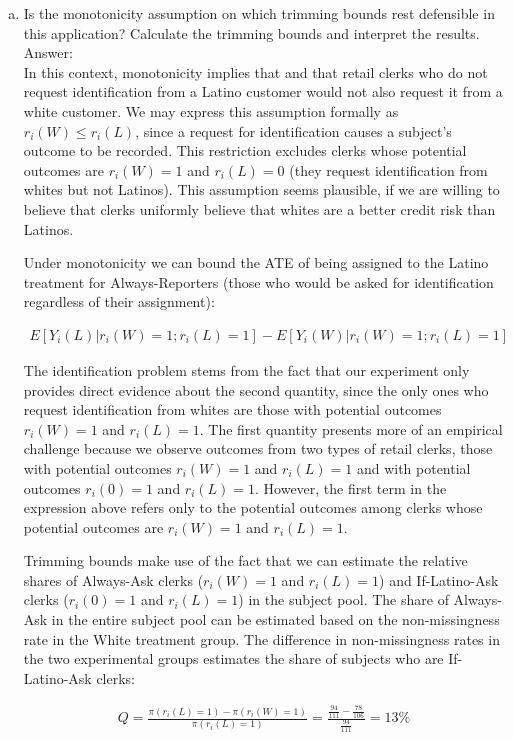 \documentclass[11pt,notitlepage]{article}\usepackage[]{graphicx}\usepackage[]{color}
\begin{document}
\begin{enumerate}[a)]
\item Is the monotonicity assumption on which trimming bounds rest defensible in this application? Calculate the trimming bounds and interpret the results. \\
Answer:\\
In this context, monotonicity implies that and that retail clerks who do not request identification from a Latino customer would not also request it from a white customer. We may express this assumption formally as $r_i(W)\leq r_i(L)$, since a request for identification causes a subject's outcome to be recorded. This restriction excludes clerks whose potential outcomes are $r_i(W)=1$ and $r_i(L)=0$ (they request identification from whites but not Latinos). This assumption seems plausible, if we are willing to believe that clerks uniformly believe that whites are a better credit risk than Latinos.

Under monotonicity we can bound the ATE of being assigned to the Latino treatment for Always-Reporters (those who would be asked for identification regardless of their assignment):

\begin{align*}
E[Y_i(L)|r_i(W)=1; r_i(L)=1]-E[Y_i(W)| r_i(W)=1; r_i(L)=1]
\end{align*}


The identification problem stems from the fact that our experiment only provides direct evidence about the second quantity, since the only ones who request identification from whites are those with potential outcomes $r_i(W)=1$ and $r_i(L)=1$.  The first quantity presents more of an empirical challenge because we observe outcomes from two types of retail clerks, those with potential outcomes $r_i(W)=1$ and $r_i(L)=1$ and with potential outcomes $r_i(0)=1$ and $r_i(L)=1$. However, the first term in the expression above refers only to the potential outcomes among clerks whose potential outcomes are $r_i(W)=1$ and $r_i(L)=1$.  

Trimming bounds make use of the fact that we can estimate the relative shares of Always-Ask clerks ($r_i(W)=1$ and $r_i(L)=1$) and If-Latino-Ask clerks ($r_i(0)=1$ and $r_i(L)=1$) in the subject pool. The share of Always-Ask in the entire subject pool can be estimated based on the non-missingness rate in the White treatment group. The difference in non-missingness rates in the two experimental groups estimates the share of subjects who are If-Latino-Ask clerks:

\begin{align*}
Q = \frac{\pi(r_i(L)=1) - \pi(r_i(W)=1)}{\pi(r_i(L)=1)} = \frac{\frac{94}{111} - \frac{78}{106}}{\frac{94}{111}} = 13\%
\end{align*}



\end{enumerate}
\end{document}
